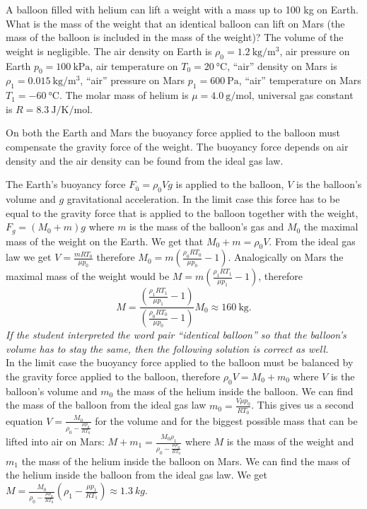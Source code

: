 {\ifEngStatement
A balloon filled with helium can lift a weight with a mass up to 100 kg on Earth. What is the mass of the weight that an identical balloon can lift on Mars (the mass of the balloon is included in the mass of the weight)? The volume of the weight is negligible. The air density on Earth is $\rho_0=\SI{1.2}{\kilogram\per\meter^3}$, air pressure on Earth $p_0=\SI{100}{\kilo\pascal}$, air temperature on $T_0=\SI{20}{\celsius}$, “air” density on Mars is $\rho_1=\SI{0.015}{\kilogram\per\meter^3}$, “air” pressure on Mars $p_1=\SI{600}{\pascal}$, “air” temperature on Mars $T_1=\SI{-60}{\celsius}$. The molar mass of helium is $\mu=\SI{4.0}{\gram\per\mole}$, universal gas constant is $R=\SI{8.3}{\joule\per\kelvin\per\mole}$.
\fi


\ifEngHint
On both the Earth and Mars the buoyancy force applied to the balloon must compensate the gravity force of the weight. The buoyancy force depends on air density and the air density can be found from the ideal gas law.
\fi


\ifEngSolution
The Earth’s buoyancy force $F_{ü}=\rho_0Vg$ is applied to the balloon, $V$ is the balloon’s volume and $g$ gravitational acceleration. In the limit case this force has to be equal to the gravity force that is applied to the balloon together with the weight, $F_g=(M_0+m)g$ where $m$ is the mass of the balloon’s gas and $M_0$ the maximal mass of the weight on the Earth. We get that $M_0+m=\rho_0V$. From the ideal gas law we get $V=\frac{mRT_0}{\mu p_0}$ therefore $M_0=m(\frac{\rho_0 RT_0}{\mu p_0}-1)$. Analogically on Mars the maximal mass of the weight would be $M=m(\frac{\rho_1RT_1}{\mu p_1}-1)$, therefore
\[M=\frac{(\frac{\rho_1RT_1}{\mu p_1}-1)}{(\frac{\rho_0RT_0}{\mu p_0}-1)}M_0\approx \SI{160}{\kilogram}.\] 
\emph{If the student interpreted the word pair “identical balloon” so that the balloon’s volume has to stay the same, then the following solution is correct as well.}\\
In the limit case the buoyancy force applied to the balloon must be balanced by the gravity force applied to the balloon, therefore $\rho_0 V=M_0+m_0$ where $V$ is the balloon’s volume and $m_0$ the mass of the helium inside the balloon. We can find the mass of the balloon from the ideal gas law $m_0=\frac{V\mu p_0}{RT_0}$. This gives us a second equation $V=\frac{M_0}{\rho_0-\frac{\mu p_0}{RT_0}}$ for the volume and for the biggest possible mass that can be lifted into air on Mars: $M+m_1=\frac{M_0\rho_1}{\rho_0-\frac{\mu p_0}{RT_0}}$ where $M$ is the mass of the weight and $m_1$ the mass of the helium inside the balloon on Mars. We can find the mass of the helium inside the balloon from the ideal gas law. We get $M=\frac{M_0}{\rho_0-\frac{\mu p_0}{RT_0}}(\rho_1-\frac{\mu p_1}{RT_1})\approx \SI{1,3}{kg}$.
\fi
}
